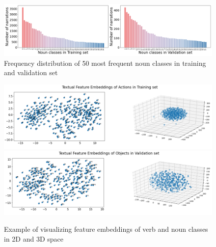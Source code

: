 \begin{figure}[hp]
    \begin{minipage}{1\textwidth}
    \centering
        \includegraphics[scale=0.3]{figures/noun_count.png}
    \caption{Frequency distribution of 50 most frequent noun classes in training and validation set}
    \label{fig:noun-freq}
    \end{minipage}
\end{figure}
\begin{figure}[htp!]
    \begin{minipage}{1\textwidth}
        \begin{center}
            \includegraphics[scale=0.36]{figures/Actions_embeddings_Training.png}
            \\
            \vspace{5mm}
            \includegraphics[scale=0.36]{figures/Objects_embeddings_Validation.png}
            \caption{Example of visualizing feature embeddings of verb and noun classes in 2D and 3D space}
            \label{fig:embedding}
        \end{center}
    \end{minipage}
\end{figure}
\clearpage

